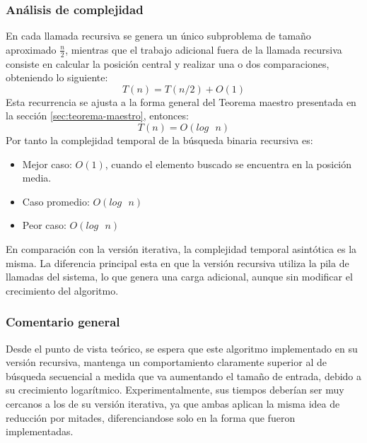 \subsubsection{Análisis de complejidad}
En cada llamada recursiva se genera un único subproblema de tamaño aproximado $\frac{n}{2}$, mientras que el trabajo adicional fuera de la llamada recursiva consiste en calcular la posición central y realizar una o dos comparaciones, obteniendo lo siguiente: $$T(n)=T(n/2)+O(1)$$ Esta recurrencia se ajusta a la forma general del Teorema maestro presentada en la sección \ref{sec:teorema-maestro}, entonces: $$T(n) = O(log\text{ }n)$$ Por tanto la complejidad temporal de la búsqueda binaria recursiva es:
\begin{itemize}
    \item Mejor caso: $O(1)$, cuando el elemento buscado se encuentra en la posición media.
    \item Caso promedio: $O(log\text{ }n)$
    \item Peor caso: $O(log\text{ }n)$
\end{itemize} 
En comparación con la versión iterativa, la complejidad temporal asintótica es la misma. La diferencia principal esta en que la versión recursiva utiliza la pila de llamadas del sistema, lo que genera una carga adicional, aunque sin modificar el crecimiento del algoritmo.

\subsubsection{Comentario general}
Desde el punto de vista teórico, se espera que este algoritmo implementado en su versión recursiva, mantenga un comportamiento claramente superior al de búsqueda secuencial a medida que va aumentando el tamaño de entrada, debido a su crecimiento logarítmico. Experimentalmente, sus tiempos deberían ser muy cercanos a los de su versión iterativa, ya que ambas aplican la misma idea de reducción por mitades, diferenciandose solo en la forma que fueron implementadas.